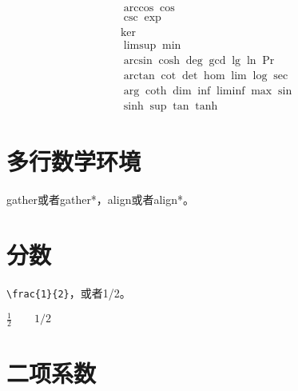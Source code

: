 \documentclass[11pt,oneside]{book}
\begin{document}
\begin{common-format}
\begin{gather*}
\arccos \cos \\
\csc \exp \\
\ker \\
\limsup \min \\ 
\arcsin \cosh \deg \gcd \lg \ln \Pr \\ 
\arctan \cot \det \hom \lim \log \sec \\
\arg \coth \dim \inf \liminf \max \sin \\
\sinh \sup \tan \tanh
\end{gather*}

\section{多行数学环境}
gather或者gather*，align或者align*。

\section{分数}
\verb+\frac{1}{2}+，或者1/2。

$\frac{1}{2} \qquad 1/2$

\section{二项系数}







\end{common-format}
\end{document}
